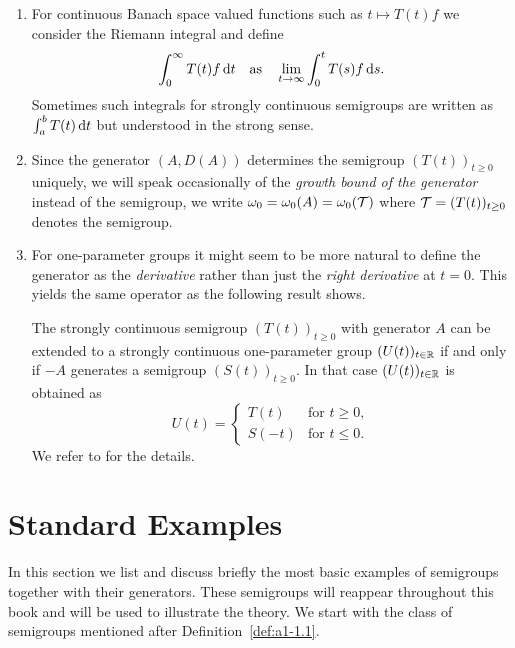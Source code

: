 \begin{remarks}\label{rem:a1-1.12}
\begin{enumerate}[\upshape(i), wide, labelindent=.25em]
\item 
For continuous Banach space valued functions such as $t \mapsto T(t)f$ we consider the Riemann integral and define 
\[
	\int_{0}^{\infty}T(t)f  \mathop{}\!\mathrm{d}{t} 
		\quad \text{as} \quad
	\lim_{t \to \infty}\int_{0}^{t}T(s)f  \mathop{}\!\mathrm{d}{s} .
\]
Sometimes such integrals for strongly continuous semigroups are written as $\int_{a}^{b}T(t) \mathop{}\!\mathrm{d}{t}$ but understood in the strong sense.

\item 
Since the generator $(A,D(A))$ determines the semigroup $(T(t))_{t \geq 0}$ uniquely, we will speak occasionally of the \emph{growth bound of the generator} instead of the semigroup, \ie we write $\omega_{0} = \omega_{0}(A) = \omega_{0}(\mathcal{T})$ where $\TT = (T(t))_{t \geq 0}$ denotes the semigroup.

\item 
For one-parameter groups it might seem to be more natural to define the generator as the \emph{derivative} rather than just the \emph{right derivative} at $t = 0$.
This yields the same operator as the following result shows.

The strongly continuous semigroup $(T(t))_{t \geq 0}$ with generator $A$ can be extended to a strongly continuous one-parameter group $(U(t))_{t \in \mathbb{R}}$ if and only if\/ $-A$ generates a semigroup $(S(t))_{t \geq 0}$.
In that case $(U(t))_{t \in \mathbb{R}}$ is obtained as
\[
    U(t) = \begin{cases}
        T(t) & \text{for } t \geq 0 ,\\
        S(-t) & \text{for } t \leq 0 .
    \end{cases}
\]
We refer to \textcite[Proposition~1.14]{davies:1980} for the details.

\end{enumerate}
\end{remarks}
\section{Standard Examples}\label{sec:a1-2}%
In this section we list and discuss briefly the most basic examples of semigroups together with their generators.
These semigroups will reappear throughout this book and will be used to illustrate the theory.
We start with the class of semigroups mentioned after Definition~\ref{def:a1-1.1}.
